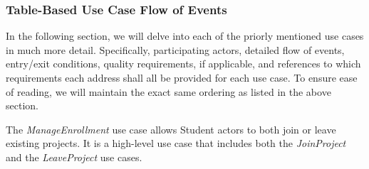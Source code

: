 \documentclass[12pt,letterpaper]{article}
\begin{document}
\subsubsection*{Table-Based Use Case Flow of Events}

In the following section, we will delve into each of the priorly mentioned use cases in much more detail. Specifically, participating actors, detailed flow of events, entry/exit conditions, quality requirements, if applicable, and 
references to which requirements each address shall all be provided for each use case. To ensure ease of reading, we will maintain the exact same ordering as listed in the above section.

The {\it ManageEnrollment} use case allows Student actors to both join or leave existing projects. It is a high-level use case that includes both the {\it JoinProject} and the {\it LeaveProject} use cases.
\end{document}
